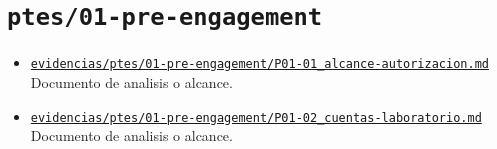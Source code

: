 \section{\texorpdfstring{\nolinkurl{ptes/01-pre-engagement}}{ptes/01-pre-engagement}}
\begin{itemize}[leftmargin=1.2em]
  \item \href{https://github.com/gamurigm/inventrack-ptes-report/blob/main/evidencias/ptes/01-pre-engagement/P01-01_alcance-autorizacion.md}{\nolinkurl{evidencias/ptes/01-pre-engagement/P01-01_alcance-autorizacion.md}}\\
  {\small Documento de analisis o alcance.}
  \item \href{https://github.com/gamurigm/inventrack-ptes-report/blob/main/evidencias/ptes/01-pre-engagement/P01-02_cuentas-laboratorio.md}{\nolinkurl{evidencias/ptes/01-pre-engagement/P01-02_cuentas-laboratorio.md}}\\
  {\small Documento de analisis o alcance.}
\end{itemize}

